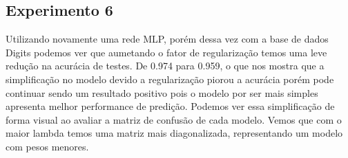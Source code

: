 \subsection*{Experimento 6}

Utilizando novamente uma rede MLP, porém dessa vez com a base de dados Digits podemos ver que aumetando o fator de regularização temos uma leve redução na acurácia de testes. De 0.974 para 0.959, o que nos mostra que a simplificação no modelo
devido a regularização piorou a acurácia porém pode continuar sendo um resultado positivo pois o modelo por ser mais simples apresenta melhor performance de predição.
Podemos ver essa simplificação de forma visual ao avaliar a matriz de confusão de cada modelo. Vemos que com o maior lambda temos uma matriz mais diagonalizada, representando um modelo com pesos menores.